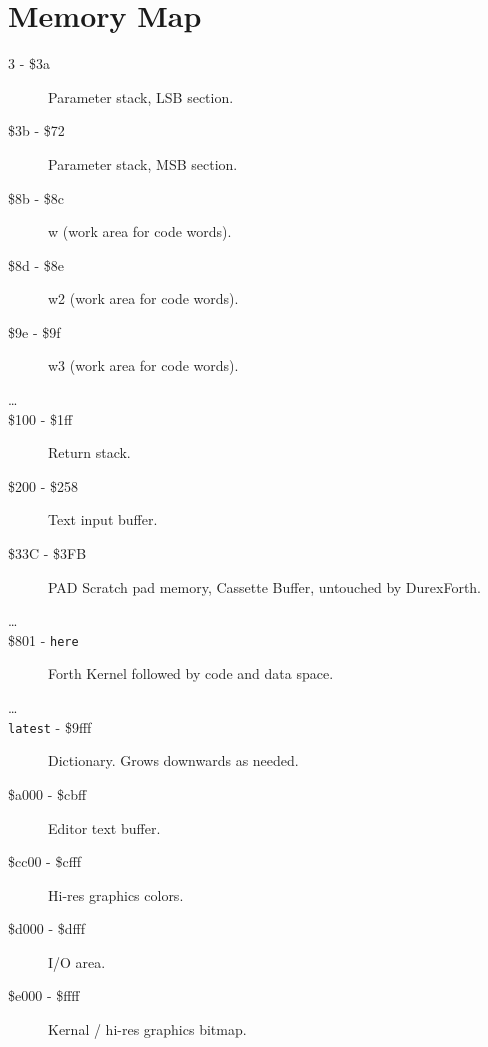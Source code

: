 \chapter{Memory Map}

\begin{description}
\item[3 - \$3a] Parameter stack, LSB section.
\item[\$3b - \$72] Parameter stack, MSB section.
\item[\$8b - \$8c] w (work area for code words).
\item[\$8d - \$8e] w2 (work area for code words).
\item[\$9e - \$9f] w3 (work area for code words).
\item[\ldots]
\item[\$100 - \$1ff] Return stack.
\item[\$200 - \$258] Text input buffer.
\item[\$33C - \$3FB] PAD Scratch pad memory, Cassette Buffer, untouched by DurexForth.
\item[\ldots]
\item[\$801 - \texttt{here}] Forth Kernel followed by code and data space.
\item[\ldots]
\item[\texttt{latest} - \$9fff] Dictionary. Grows downwards as needed.
\item[\$a000 - \$cbff] Editor text buffer.
\item[\$cc00 - \$cfff] Hi-res graphics colors.
\item[\$d000 - \$dfff] I/O area.
\item[\$e000 - \$ffff] Kernal / hi-res graphics bitmap.

\end{description}

